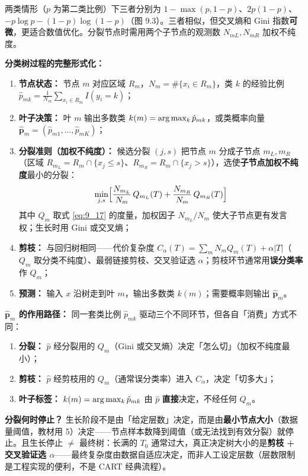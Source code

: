 两类情形（$p$ 为第二类比例）下三者分别为 $1 - \max(p, 1-p)$、$2p(1-p)$、$-p\log p - (1-p)\log(1-p)$（图 9.3）。三者相似，但交叉熵和 Gini 指数\textbf{可微}，更适合数值优化。分裂节点时需用两个子节点的观测数 $N_{mL}, N_{mR}$ 加权不纯度。

\textbf{分类树过程的完整形式化：}
\begin{enumerate}
    \item \textbf{节点状态：} 节点 $m$ 对应区域 $R_m$，$N_m = \#\{x_i \in R_m\}$，类 $k$ 的经验比例 $\hat p_{mk} = \frac{1}{N_m}\sum_{x_i \in R_m} I(y_i = k)$；
    \item \textbf{叶子决策：} 叶 $m$ 输出多数类 $k(m) = \arg\max_k \hat p_{mk}$，或类概率向量 $\hat{\mathbf p}_m = (\hat p_{m1}, \ldots, \hat p_{mK})$；
    \item \textbf{分裂准则（加权不纯度）：} 候选分裂 $(j,s)$ 把节点 $m$ 分成子节点 $m_L, m_R$（区域 $R_{m_L} = R_m \cap \{x_j \le s\}$、$R_{m_R} = R_m \cap \{x_j > s\}$），选使\textbf{子节点加权不纯度}最小的分裂：
    \[
        \min_{j,s}\Bigl[\frac{N_{m_L}}{N_m}\,Q_{m_L}(T) + \frac{N_{m_R}}{N_m}\,Q_{m_R}(T)\Bigr]
    \]
    其中 $Q_m$ 取式 \eqref{eq:9_17} 的度量，加权因子 $N_{m_L}/N_m$ 使大子节点更有发言权；生长时用 Gini 或交叉熵；
    \item \textbf{剪枝：} 与回归树相同——代价复杂度 $C_\alpha(T) = \sum_m N_m Q_m(T) + \alpha|T|$（$Q_m$ 取分类不纯度）、最弱链接剪枝、交叉验证选 $\alpha$；剪枝环节通常用\textbf{误分类率}作 $Q_m$；
    \item \textbf{预测：} 输入 $x$ 沿树走到叶 $m$，输出多数类 $k(m)$；需要概率则输出 $\hat{\mathbf p}_m$。
\end{enumerate}

\textbf{$\hat{\mathbf p}_m$ 的作用路径：} 同一套类比例 $\hat p_{mk}$ 驱动三个不同环节，但各自「消费」方式不同：
\begin{enumerate}
    \item \textbf{分裂：} $\hat p$ 经分裂用的 $Q_m$（Gini 或交叉熵）决定「怎么切」（加权不纯度最小）；
    \item \textbf{剪枝：} $\hat p$ 经剪枝用的 $Q_m$（通常误分类率）进入 $C_\alpha$，决定「切多大」；
    \item \textbf{叶子标签：} $k(m) = \arg\max_k \hat p_{mk}$ 由 $\hat p$ \textbf{直接}决定，不经任何 $Q_m$。
\end{enumerate}

\begin{remark}
    \textbf{分裂何时停止？} 生长阶段不是由「给定层数」决定，而是由\textbf{最小节点大小}（数据量阈值，教材用 5）决定——节点样本数降到阈值（或无法找到有效分裂）就停止。且生长停止 $\ne$ 最终树：长满的 $T_0$ 通常过大，真正决定树大小的是\textbf{剪枝 + 交叉验证选 $\alpha$}——最终复杂度由数据自适应决定，而非人工设定层数（层数限制是工程实现的便利，不是 CART 经典流程）。
\end{remark}

